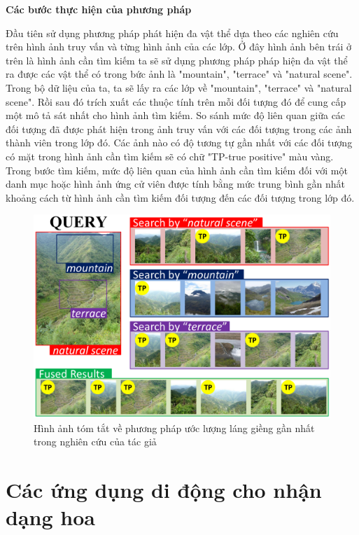 \documentclass[12pt]{report}
\begin{document}
				
																						
		\textbf{Các bước thực hiện của phương pháp}
		
																						
		Đầu tiên sử dụng phương pháp phát hiện đa vật thể dựa theo các nghiên cứu \cite{cia_object_propo_1} \cite{cia_object_propo_2} \cite{cia_object_propo_3} trên hình ảnh truy vấn và từng hình ảnh của các lớp. Ở đây hình ảnh bên trái ở trên là hình ảnh cần tìm kiếm ta sẽ sử dụng phương pháp pháp hiện đa vật thể ra được các vật thể có trong bức ảnh là "mountain", "terrace" và "natural scene".																				
		Trong bộ dữ liệu của ta, ta sẽ lấy ra các lớp về "mountain", "terrace" và "natural scene". Rồi sau đó trích xuất các thuộc tính trên mỗi đối tượng đó để cung cấp một mô tả sát nhất cho hình ảnh tìm kiếm. 
		So sánh mức độ liên quan giữa các đối tượng đã được phát hiện trong ảnh truy vấn với các đối tượng trong các ảnh thành viên trong lớp đó. Các ảnh nào có độ tương tự gần nhất với các đối tượng có mặt trong hình ảnh cần tìm kiếm sẽ có chữ "TP-true positive" màu vàng.
		Trong bước tìm kiếm, mức độ liên quan của hình ảnh cần tìm kiếm đối với một danh mục hoặc hình ảnh ứng cử viên được tính bằng mức trung bình gần nhất khoảng cách từ hình ảnh cần tìm kiếm đối tượng đến các đối tượng trong lớp đó.
		
		\begin{figure}[h]
			\centering
			\includegraphics[scale=0.3]{one}
			\caption{Hình ảnh tóm tắt về phương pháp ước lượng láng giềng gần nhất trong nghiên cứu \cite{cia-ONE} của tác giả}
			\label{fig:one}
		\end{figure}		\newpage
																						
		\section{Các ứng dụng di động cho nhận dạng hoa}
																				
\end{document}
